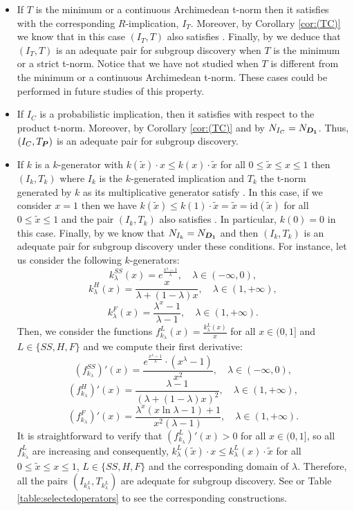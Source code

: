 \begin{itemize}
	\item  If $T$ is the minimum or a continuous Archimedean t-norm then it satisfies \MTC with the corresponding $R$-implication, $I_T$. Moreover, by Corollary \ref{cor:(TC)} we know that in this case $(I_T,T)$ also satisfies \TC. Finally, by \cite[Theorem 2.5.4]{Baczynski2008} we deduce that $(I_T,T)$ is an adequate pair for subgroup discovery when $T$ is the minimum or a strict t-norm. Notice that we have not studied \MTC when $T$ is different from the minimum or a continuous Archimedean t-norm. These cases could be performed in future studies of this property.
	\item If $I_C$ is a probabilistic implication, then it satisfies \MTC with respect to the product t-norm. Moreover, by Corollary \ref{cor:(TC)} and by \cite[Lemma 2.21]{Helbin2019} $N_{I_C}=N_{\bm{D_1}}$. Thus, $(I_C,T_{\bm{P}})$ is an adequate pair for subgroup discovery.
	\item  If $k$ is a $k$-generator with $k(\tilde{x}) \cdot x \leq k(x) \cdot \tilde{x}$ for all $0 \leq \tilde{x} \leq x \leq 1$ then $(I_k,T_k)$ where $I_k$ is the $k$-generated implication and $T_k$ the t-norm generated by $k$ as its multiplicative generator satisfy \MTC. In this case, if we consider $x=1$ then we have $k(\tilde{x}) \leq k(1) \cdot \tilde{x} = \tilde{x} = \text{id}(\tilde{x})$ for all $0 \leq \tilde{x} \leq 1$ and the pair $(I_k,T_k)$ also satisfies \TC. In particular, $k(0)=0$ in this case. Finally, by \cite[(i)-Proposition 3]{Zhou2021} we know that $N_{I_k}= N_{\bm{D_1}}$ and then $(I_k,T_k)$ is an adequate pair for subgroup discovery under these conditions. For instance, let us consider the following $k$-generators:
	$$k_{\lambda}^{SS}(x) = e^{\frac{x^{\lambda}-1}{\lambda}}, \quad \lambda \in (-\infty,0),$$
	$$k_{\lambda}^{H}(x) = \frac{x}{\lambda + (1-\lambda)x}, \quad \lambda \in (1,+\infty),$$
	$$k_{\lambda}^{F}(x) = \frac{\lambda^x-1}{\lambda-1}, \quad \lambda \in (1,+\infty).$$
	Then, we consider the functions $f_{k_{\lambda}}^L(x)=\frac{k_{\lambda}^{L}(x)}{x}$ for all $x \in (0,1]$ and $L \in \{SS,H,F\}$ and we compute their first derivative:
	$$(f_{k_{\lambda}}^{SS})'(x)= \frac{e^{\frac{x^{\lambda}-1}{\lambda}} \cdot (x^{\lambda}-1)}{x^2}, \quad \lambda \in (-\infty,0),$$
	$$(f_{k_{\lambda}}^{H})'(x)= \frac{\lambda-1}{(\lambda+(1-\lambda)x)^2}, \quad \lambda \in (1,+\infty),$$
	$$(f_{k_{\lambda}}^{F})'(x)= \frac{\lambda^x (x \ln \lambda -1)+1}{x^2 (\lambda-1)}, \quad \lambda \in (1,+\infty).$$
	It is straightforward to verify that $(f_{k_{\lambda}}^{L})'(x)>0$ for all $x \in (0,1]$, so all $f_{k_{\lambda}}^{L}$ are increasing and consequently, $k_{\lambda}^L(\tilde{x}) \cdot x \leq k_{\lambda}^{L}(x) \cdot \tilde{x}$ for all $0 \leq \tilde{x} \leq x \leq 1$,  $L \in \{SS,H,F\}$ and the corresponding domain of $\lambda$. Therefore, all the pairs $(I_{k_{\lambda}^L},T_{k_{\lambda}^L})$ are adequate for subgroup discovery. See \cite[Example 1]{Zhou2021} or Table \ref{table:selectedoperators} to see the corresponding constructions.

\end{itemize}

